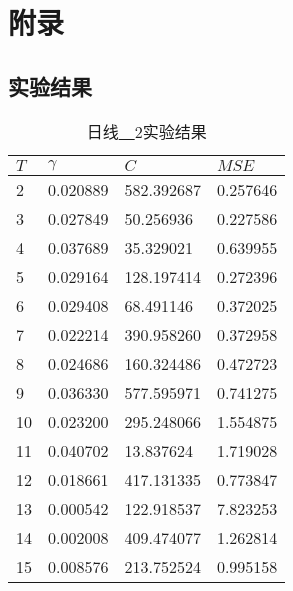 
\chapter{附录}

\section{实验结果}

\begin{table}[ht]
    \centering
    \caption{日线\underline{~~}2实验结果}
    \begin{tabular}{llll}
        \hline
        $T$&  $\gamma$ &         $C$ &     $MSE$ \\
        \hline
         2 &  0.020889 &  582.392687 &  0.257646 \\
         3 &  0.027849 &   50.256936 &  0.227586 \\
         4 &  0.037689 &   35.329021 &  0.639955 \\
         5 &  0.029164 &  128.197414 &  0.272396 \\
         6 &  0.029408 &   68.491146 &  0.372025 \\
         7 &  0.022214 &  390.958260 &  0.372958 \\
         8 &  0.024686 &  160.324486 &  0.472723 \\
         9 &  0.036330 &  577.595971 &  0.741275 \\
        10 &  0.023200 &  295.248066 &  1.554875 \\
        11 &  0.040702 &   13.837624 &  1.719028 \\
        12 &  0.018661 &  417.131335 &  0.773847 \\
        13 &  0.000542 &  122.918537 &  7.823253 \\
        14 &  0.002008 &  409.474077 &  1.262814 \\
        15 &  0.008576 &  213.752524 &  0.995158 \\
        \hline
    \end{tabular}
\end{table}

